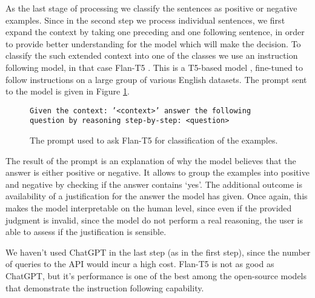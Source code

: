 As the last stage of processing we classify the sentences as positive or negative examples. Since in the second step
we process individual sentences, we first expand the context by taking one preceding and one following sentence, in 
order to provide better understanding for the model which will make the decision. To classify the such extended 
context into one of the classes we use an instruction following model, in that case Flan-T5 \cite{chung2022scaling}. 
This is a T5-based model \cite{raffel2020exploring}, fine-tuned to follow instructions on a large group of various
English datasets. The prompt sent to the model is given in Figure \ref{fig:flan-instruction}.

\begin{figure}[htbp]
  \texttt{Given the context: '<context>' answer the following question by reasoning step-by-step: <question>} 
  \caption{The prompt used to ask Flan-T5 for classification of the examples.}
  \label{fig:flan-instruction}
\end{figure}

The result of the prompt is an explanation of why the model believes that the answer is either positive or negative.
It allows to group the examples into positive and negative by checking if the answer contains `yes'. The additional
outcome is availability of a justification for the answer the model has given. Once again, this makes the model
interpretable on the human level, since even if the provided judgment is invalid, since the model do not perform 
a real reasoning, the user is able to assess if the justification is sensible. 

We haven't used ChatGPT in the last step (as in the first step), since the number of queries to the API would incur
a high cost. Flan-T5 is not as good as ChatGPT, but it's performance is one of the best \cite{chia2023instructeval} 
among the open-source models that demonstrate the instruction following capability.